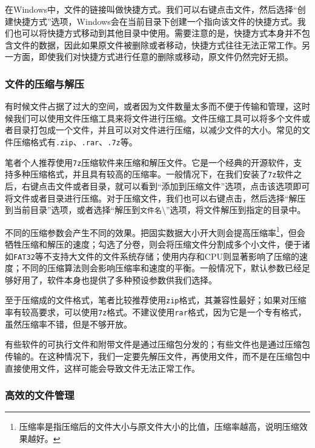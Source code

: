 在Windows中，文件的链接叫做快捷方式。我们可以右键点击文件，然后选择“创建快捷方式”选项，Windows会在当前目录下创建一个指向该文件的快捷方式。我们也可以将快捷方式移动到其他目录中使用。需要注意的是，快捷方式本身并不包含文件的数据，因此如果原文件被删除或者移动，快捷方式往往无法正常工作。另一方面，即使我们对快捷方式进行任意的删除或移动，原文件仍然完好无损。

\subsubsection{文件的压缩与解压}

有时候文件占据了过大的空间，或者因为文件数量太多而不便于传输和管理，这时候我们可以使用文件压缩工具来将文件进行压缩。文件压缩工具可以将多个文件或者目录打包成一个文件，并且可以对文件进行压缩，以减少文件的大小。常见的文件压缩格式有\texttt{.zip}、\texttt{.rar}、\texttt{.7z}等。

笔者个人推荐使用\texttt{7z}压缩软件来压缩和解压文件。它是一个经典的开源软件，支持多种压缩格式，并且具有较高的压缩率。一般情况下，在我们安装了\texttt{7z}软件之后，右键点击文件或者目录，就可以看到“添加到压缩文件”选项，点击该选项即可将文件或者目录进行压缩。对于压缩文件，我们也可以右键点击，然后选择“解压到当前目录”选项，或者选择“解压到\texttt{文件名}\textbackslash”选项，将文件解压到指定的目录中。

不同的压缩参数会产生不同的效果。把固实数据大小开大则会提高压缩率\footnote{压缩率是指压缩后的文件大小与原文件大小的比值，压缩率越高，说明压缩效果越好。}，但会牺牲压缩和解压的速度；勾选了分卷，则会将压缩文件分割成多个小文件，便于诸如\texttt{FAT32}等不支持大文件的文件系统存储；使用内存和CPU则显著影响了压缩的速度；不同的压缩算法则会影响压缩率和速度的平衡。一般情况下，默认参数已经足够好用了，软件本身也提供了多种预设参数供我们选择。

至于压缩成的文件格式，笔者比较推荐使用\texttt{zip}格式，其兼容性最好；如果对压缩率有较高要求，可以使用\texttt{7z}格式。不建议使用\texttt{rar}格式，因为它是一个专有格式，虽然压缩率不错，但是不够开放。

\begin{caution}
  有些软件的可执行文件和附带文件是通过压缩包分发的；有些文件也是通过压缩包传输的。在这种情况下，我们一定要先解压文件，再使用文件，而不是在压缩包中直接使用文件，这样可能会导致文件无法正常工作。
\end{caution}

\subsubsection{高效的文件管理}

